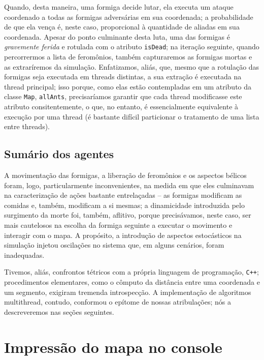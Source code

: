 \documentclass[12pt]{article}
\theoremstyle{definition}
\begin{document}
Quando, desta maneira, uma formiga decide lutar, ela executa um ataque coordenado a todas as formigas adversárias em sua coordenada; a probabilidade de que ela vença é, neste caso, proporcional à quantidade de aliadas em sua coordenada. Apesar do ponto culminante desta luta, uma das formigas é \textit{gravemente ferida} e rotulada com o atributo \texttt{isDead}; na iteração seguinte, quando percorrermos a lista de feromônios, também capturaremos as formigas mortas e as extraríremos da simulação. Enfatizamos, aliás, que, mesmo que a rotulação das formigas seja executada em threads distintas, a sua extração é executada na thread principal; isso porque, como elas estão contempladas em um atributo da classe \texttt{Map}, \texttt{allAnts}, precisaríamos garantir que cada thread modificasse este atributo consitentemente, o que, no entanto, é essencialmente equivalente à execução por uma thread (é bastante difícil particionar o tratamento de uma lista entre threads). 

\subsection{Sumário dos agentes} 

A movimentação das formigas, a liberação de feromônios e os aspectos bélicos foram, logo, particularmente inconvenientes, na medida em que eles culminavam na caracterização de ações bastante entrelaçadas -- as formigas modificam as comidas e, também, modificam a si mesmas; a dinamicidade introduzida pelo surgimento da morte foi, também, aflitivo, porque precisávamos, neste caso, ser mais cautelosos na escolha da formiga seguinte a executar o movimento e interagir com o mapa. A propósito, a introdução de aspectos estocásticos na simulação injetou oscilações no sistema que, em alguns cenários, foram inadequadas. 

Tivemos, aliás, confrontos tétricos com a própria linguagem de programação, \texttt{C++}; procedimentos elementares, como o cômputo da distância entre uma coordenada e um segmento, exigiram tremenda introspecção. A implementação de algoritmos multithread, contudo, conformou o epítome de nossas atribulações; nós a descreveremos nas seções seguintes. 

\section{Impressão do mapa no console} 
\end{document}
